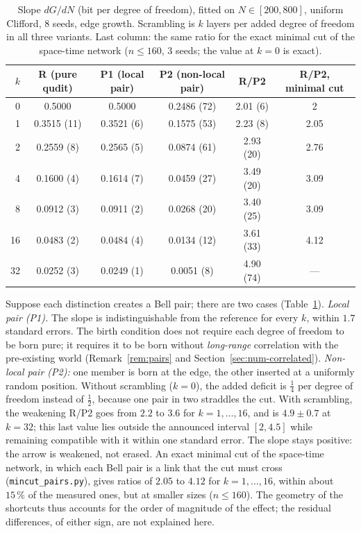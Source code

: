 \begin{table}[h]
\centering\small
\begin{tabular}{rccccc}
\toprule
$k$ & R (pure qudit) & P1 (local pair) & P2 (non-local pair) & R/P2 & R/P2, minimal cut\\
\midrule
0  & 0.5000 & 0.5000 & 0.2486 (72) & 2.01 (6) & 2\\
1  & 0.3515 (11) & 0.3521 (6) & 0.1575 (53) & 2.23 (8) & 2.05\\
2  & 0.2559 (8) & 0.2565 (5) & 0.0874 (61) & 2.93 (20) & 2.76\\
4  & 0.1600 (4) & 0.1614 (7) & 0.0459 (27) & 3.49 (20) & 3.09\\
8  & 0.0912 (3) & 0.0911 (2) & 0.0268 (20) & 3.40 (25) & 3.09\\
16 & 0.0483 (2) & 0.0484 (4) & 0.0134 (12) & 3.61 (33) & 4.12\\
32 & 0.0252 (3) & 0.0249 (1) & 0.0051 (8) & 4.90 (74) & ---\\
\bottomrule
\end{tabular}
\caption{Slope $dG/dN$ (bit per degree of freedom), fitted on $N\in[200,800]$, uniform Clifford, $8$ seeds, edge growth. Scrambling is $k$ layers per added degree of freedom in all three variants. Last column: the same ratio for the exact minimal cut of the space-time network ($n\le160$, $3$ seeds; the value at $k=0$ is exact).}
\label{tab:pairs}
\end{table}

Suppose each distinction creates a Bell pair; there are two cases (Table~\ref{tab:pairs}).
\emph{Local pair (P1).} The slope is indistinguishable from the reference for every $k$, within $1.7$ standard errors. The birth condition does not require each degree of freedom to be born pure; it requires it to be born without \emph{long-range} correlation with the pre-existing world (Remark~\ref{rem:pairs} and Section~\ref{sec:num-correlated}).
\emph{Non-local pair (P2):} one member is born at the edge, the other inserted at a uniformly random position. Without scrambling ($k=0$), the added deficit is $\frac14$ per degree of freedom instead of $\frac12$, because one pair in two straddles the cut. With scrambling, the weakening R/P2 goes from $2.2$ to $3.6$ for $k=1,\dots,16$, and is $4.9\pm0.7$ at $k=32$; this last value lies outside the announced interval $[2,4.5]$ while remaining compatible with it within one standard error. The slope stays positive: the arrow is weakened, not erased. An exact minimal cut of the space-time network, in which each Bell pair is a link that the cut must cross (\texttt{mincut\_pairs.py}), gives ratios of $2.05$ to $4.12$ for $k=1,\dots,16$, within about $15\,\%$ of the measured ones, but at smaller sizes ($n\le160$). The geometry of the shortcuts thus accounts for the order of magnitude of the effect; the residual differences, of either sign, are not explained here.

